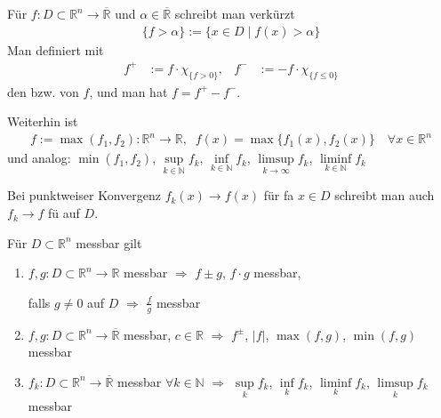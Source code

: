 \begin{*definition}
Für $f:D\subset\mathbb{R}^n\to\overline{\mathbb{R}}$ und $\alpha\in\overline{\mathbb{R}}$ schreibt man verkürzt
\begin{align*}
\{ f > \alpha \} := \{ x\in D \mid f(x) > \alpha \}
\end{align*}
Man definiert mit \begin{align*}
	f^{+} &:= f\cdot \chi_{\{f > 0\}}, & f^{-} &:= -f\cdot \chi_{\{f \le 0\}}
\end{align*}
den  bzw.  von $f$, und man hat $f = f^+ - f^-$.

Weiterhin ist 
\begin{align*}
f:=\max(f_1, f_2):\mathbb{R}^n\to\mathbb{R},\;\;f(x) = \max \{ f_1(x), f_2(x) \} \quad \forall x\in\mathbb{R}^n
\end{align*}
und analog: $\min(f_1, f_2)$, $\sup\limits_{k\in\mathbb{N}} f_k$, $\inf\limits_{k\in\mathbb{N}} f_k$, $\limsup\limits_{k\to\infty} f_k$, $\liminf\limits_{k\in\mathbb{N}} f_k$

Bei punktweiser Konvergenz $f_k(x)\to f(x)$ für \gls{fa} $x\in D$ schreibt man auch $f_k\to f$ \gls{fü} auf $D$.
\end{*definition}

\begin{proposition}
	Für $D\subset\mathbb{R}^n$ messbar gilt \begin{enumerate}[label={\alph*)}]
		\item {}
		$f,g:D\subset\mathbb{R}^n\to\mathbb{R}$ messbar $\Rightarrow$ $f\pm g$, $f\cdot g$ messbar,
		
		falls $g\neq 0$ auf $D$ $\Rightarrow$ $\frac{f}{g}$ messbar
		\item {}
		$f,g:D\subset\mathbb{R}^n\to\overline{\mathbb{R}}$ messbar, $c\in\mathbb{R}$ $\Rightarrow$ $f^{\pm}$, $\vert f \vert$, $\max(f,g)$, $\min(f,g)$ messbar
		\item {}
		$f_k:D\subset\mathbb{R}^n\to\overline{\mathbb{R}}$ messbar $\forall k\in\mathbb{N}$ $\Rightarrow$ $\sup\limits_{k} f_k$, $\inf\limits_{k} f_k$, $\liminf\limits_{k} f_k$, $\limsup\limits_{k} f_k$ messbar
	\end{enumerate}
\end{proposition}

